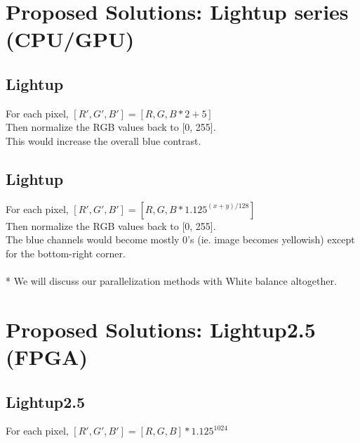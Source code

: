 \documentclass{acm_proc_article-sp}
\begin{document}
\section{Proposed Solutions: Lightup series (CPU/GPU)}
\subsection{Lightup}
For each pixel, \([R', G', B'] = [R, G, B * 2 + 5] \) \\
Then normalize the RGB values back to [0, 255]. \\
This would increase the overall blue contrast.
\subsection{Lightup}
For each pixel, \([R', G', B'] = [R, G, B * 1.125^{(x + y) / 128}]\) \\
Then normalize the RGB values back to [0, 255]. \\
The blue channels would become mostly 0's (ie. image becomes yellowish) except for the bottom-right corner. \\
\\
* We will discuss our parallelization methods with White balance altogether.

\section{Proposed Solutions: Lightup2.5 (FPGA)}
\subsection{Lightup2.5}
For each pixel, \([R', G', B'] = [R, G, B] * 1.125^{1024}\)
\end{document}
